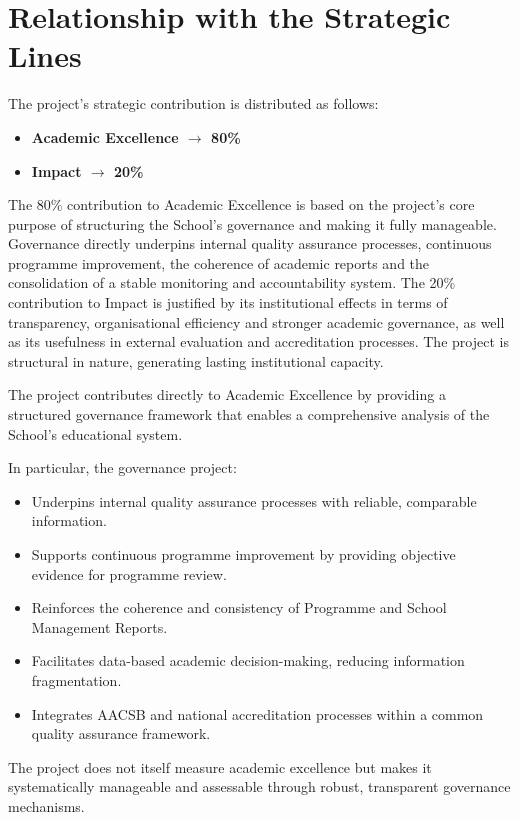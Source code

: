 \documentclass[11pt,a4paper]{scrreprt}
\begin{document}
\section{Relationship with the Strategic Lines}

The project's strategic contribution is distributed as follows: 

\begin{itemize}[noitemsep,topsep=2pt]
\item \textbf{Academic Excellence $\rightarrow$ 80\%}
\item \textbf{Impact $\rightarrow$ 20\%}
\end{itemize}

The 80\% contribution to Academic Excellence is based on the project's core purpose of structuring the School's governance and making it fully manageable. Governance directly underpins internal quality assurance processes, continuous programme improvement, the coherence of academic reports and the consolidation of a stable monitoring and accountability system. The 20\% contribution to Impact is justified by its institutional effects in terms of transparency, organisational efficiency and stronger academic governance, as well as its usefulness in external evaluation and accreditation processes. The project is structural in nature, generating lasting institutional capacity. 

The project contributes directly to Academic Excellence by providing a structured governance framework that enables a comprehensive analysis of the School's educational system. 

In particular, the governance project: 

\begin{itemize}[noitemsep,topsep=2pt]
\item Underpins internal quality assurance processes with reliable, comparable information. 

\item Supports continuous programme improvement by providing objective evidence for programme review. 

\item Reinforces the coherence and consistency of Programme and School Management Reports. 

\item Facilitates data-based academic decision-making, reducing information fragmentation. 

\item Integrates AACSB and national accreditation processes within a common quality assurance framework. 
\end{itemize}
The project does not itself measure academic excellence but makes it systematically manageable and assessable through robust, transparent governance mechanisms. 
\end{document}
